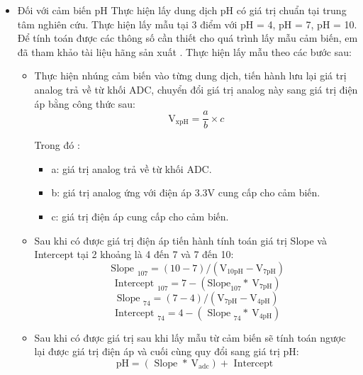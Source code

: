 \documentclass{article} %
\begin{document}
	\begin{itemize}
		\item Đối với cảm biến pH
		Thực hiện lấy dung dịch pH có giá trị chuẩn tại trung tâm nghiên cứu. Thực hiện lấy mẫu tại 3 điểm với pH = 4, pH = 7, pH = 10. Để tính toán được các thông số cần thiết cho quá trình lấy mẫu cảm biến, em đã tham khảo tài liệu hãng sản xuất \cite{pHDF}. Thực hiện lấy mẫu theo các bước sau:
		\begin{itemize}[label=$\ast$]
	
			\item Thực hiện nhúng cảm biến vào từng dung dịch, tiến hành lưu lại giá trị analog trả về từ khối ADC, chuyển đổi giá trị analog này sang giá trị điện áp bằng công thức sau:
			\begin{equation}
				\mathrm{V}_{\mathrm{xpH}}=\frac{a}{b} \times c    
				\label{CTDA}
			\end{equation}
			
			Trong đó : 
			\begin{itemize}
				\item a: giá trị analog trả về từ khối ADC.
				\item b: giá trị analog ứng với điện áp 3.3V cung cấp cho cảm biến.
				\item c: giá trị điện áp cung cấp cho cảm biến.
			\end{itemize}
			\item Sau khi có được giá trị điện áp tiến hành tính toán giá trị Slope và Intercept tại 2 khoảng là 4 đến 7 và 7 đến 10:
			\begin{equation}
				\text { Slope }_{107}=(10-7) /\left(\mathrm{V}_{10 \mathrm{pH}}-\mathrm{V}_{7 \mathrm{pH}}\right) 
			\end{equation}
			\begin{equation}
				\text { Intercept }_{107}=7-\left(\mathrm{Slope}_{107} * \mathrm{~V}_{7 \mathrm{pH}}\right) 
			\end{equation}
			\begin{equation}
				\text { Slope }_{74}=(7-4) /\left(\mathrm{V}_{7 \mathrm{pH}}-\mathrm{V}_{4 \mathrm{pH}}\right) 
			\end{equation}
			\begin{equation}
				\text { Intercept }_{74}=4-\left(\text { Slope }_{74} * \mathrm{~V}_{4 \mathrm{pH}}\right)     
			\end{equation}
			\item Sau khi có được giá trị sau khi lấy mẫu từ cảm biến sẽ tính toán ngược lại được giá trị điện áp và cuối cùng quy đổi sang giá trị pH:
			\begin{equation}
				\mathrm{pH}=\left(\text { Slope } * \mathrm{~V}_{\mathrm{adc}}\right)+\text { Intercept }     
			\end{equation}
			

\end{itemize}
\end{itemize}
\end{document}
